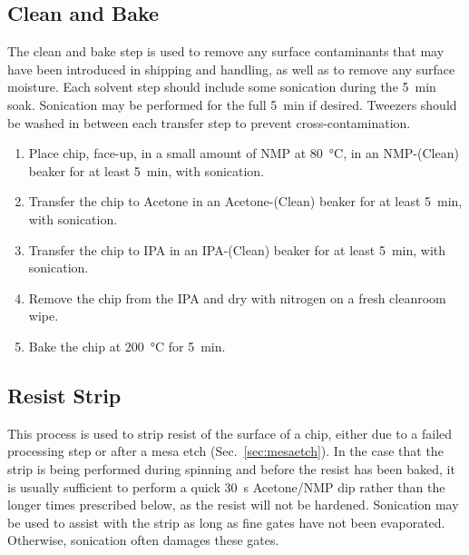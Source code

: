 \subsection{Clean and Bake}
\label{sec:clean}
The clean and bake step is used to remove any surface contaminants that may have been introduced in shipping and handling, as well as to
remove any surface moisture. Each solvent step should include some sonication during the \SI{5}{\minute} soak. Sonication may be performed for
the full \SI{5}{\minute} if desired. Tweezers should be washed in between each transfer step to prevent cross-contamination.


\begin{enumerate}
    \item Place chip, face-up, in a small amount of NMP at \SI{80}{\celsius}, in an NMP-(Clean) beaker for at least \SI{5}{\minute}, with sonication.
    \item Transfer the chip to Acetone in an Acetone-(Clean) beaker for at least \SI{5}{\minute}, with sonication.
    \item Transfer the chip to IPA in an IPA-(Clean) beaker for at least \SI{5}{\minute}, with sonication.
    \item Remove the chip from the IPA and dry with nitrogen on a fresh cleanroom wipe.
    \item Bake the chip at \SI{200}{\celsius} for \SI{5}{\minute}.
\end{enumerate}

\subsection{Resist Strip}
\label{sec:strip}
This process is used to strip resist of the surface of a chip, either due to a failed processing step or after a mesa etch (Sec.~\ref{sec:mesaetch}).
In the case that the strip is being performed during spinning and before the resist has been baked, it is usually sufficient to perform a quick \SI{30}{\second}
Acetone/NMP dip rather than the longer times prescribed below, as the resist will not be hardened. Sonication may be used to assist with the strip
as long as fine gates have not been evaporated. Otherwise, sonication often damages these gates.


